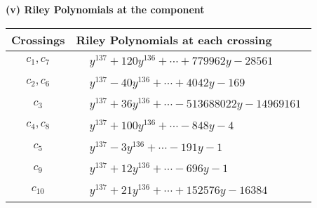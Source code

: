 \documentclass[1p]{elsarticle_modified}
\theoremstyle{definition}
\begin{document}
\newpage\renewcommand{\arraystretch}{1}
\flushleft \textbf{(v) Riley Polynomials at the component}\newline \\
\begin{tabular}{m{50pt}|m{274pt}}
Crossings & \hspace{64pt}Riley Polynomials at each crossing \\
\hline $$\begin{aligned}c_{1},c_{7}\end{aligned}$$&$\begin{aligned}
&y^{137}+120 y^{136}+\cdots+779962 y-28561
\end{aligned}$\\
\hline $$\begin{aligned}c_{2},c_{6}\end{aligned}$$&$\begin{aligned}
&y^{137}-40 y^{136}+\cdots+4042 y-169
\end{aligned}$\\
\hline $$\begin{aligned}c_{3}\end{aligned}$$&$\begin{aligned}
&y^{137}+36 y^{136}+\cdots-513688022 y-14969161
\end{aligned}$\\
\hline $$\begin{aligned}c_{4},c_{8}\end{aligned}$$&$\begin{aligned}
&y^{137}+100 y^{136}+\cdots-848 y-4
\end{aligned}$\\
\hline $$\begin{aligned}c_{5}\end{aligned}$$&$\begin{aligned}
&y^{137}-3 y^{136}+\cdots-191 y-1
\end{aligned}$\\
\hline $$\begin{aligned}c_{9}\end{aligned}$$&$\begin{aligned}
&y^{137}+12 y^{136}+\cdots-696 y-1
\end{aligned}$\\
\hline $$\begin{aligned}c_{10}\end{aligned}$$&$\begin{aligned}
&y^{137}+21 y^{136}+\cdots+152576 y-16384
\end{aligned}$\\

\end{tabular}
\end{document}
